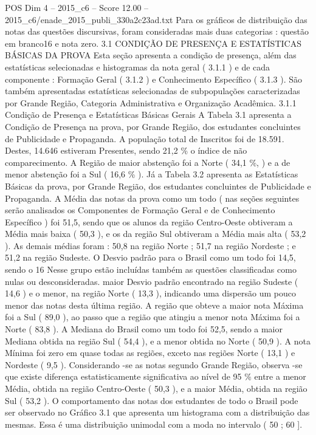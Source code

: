 \begin{textsample}{POS Dim 4 – 2015\_c6 – Score 12.00 – 2015\_c6/enade\_2015\_publi\_330a2c23ad.txt}
Para os gráficos de distribuição das notas das questões discursivas, foram consideradas mais duas categorias : questão em branco16 e nota zero. 3.1 CONDIÇÃO DE PRESENÇA E ESTATÍSTICAS BÁSICAS DA PROVA Esta seção apresenta a condição de presença, além das estatísticas selecionadas e histogramas da nota geral ( 3.1.1 ) e de cada componente : Formação Geral ( 3.1.2 ) e Conhecimento Específico ( 3.1.3 ).
São também apresentadas estatísticas selecionadas de subpopulações caracterizadas por Grande Região, Categoria Administrativa e Organização Acadêmica. 3.1.1 Condição de Presença e Estatísticas Básicas Gerais A Tabela 3.1 apresenta a Condição de Presença na prova, por Grande Região, dos estudantes concluintes de Publicidade e Propaganda.
A população total de Inscritos foi de 18.591.
Destes, 14.646 estiveram Presentes, sendo 21,2 \% o índice de não comparecimento.
A Região de maior abstenção foi a Norte ( 34,1 \%, ) e a de menor abstenção foi a Sul ( 16,6 \% ).
Já a Tabela 3.2 apresenta as Estatísticas Básicas da prova, por Grande Região, dos estudantes concluintes de Publicidade e Propaganda.
A Média das notas da prova como um todo ( nas seções seguintes serão analisados os Componentes de Formação Geral e de Conhecimento Específico ) foi 51,5, sendo que os alunos da região Centro-Oeste obtiveram a Média mais baixa ( 50,3 ), e os da região Sul obtiveram a Média mais alta ( 53,2 ).
As demais médias foram : 50,8 na região Norte ; 51,7 na região Nordeste ; e 51,2 na região Sudeste.
O Desvio padrão para o Brasil como um todo foi 14,5, sendo o 16 Nesse grupo estão incluídas também as questões classificadas como nulas ou desconsideradas. maior Desvio padrão encontrado na região Sudeste ( 14,6 ) e o menor, na região Norte ( 13,3 ), indicando uma dispersão um pouco menor das notas desta última região.
A região que obteve a maior nota Máxima foi a Sul ( 89,0 ), ao passo que a região que atingiu a menor nota Máxima foi a Norte ( 83,8 ).
A Mediana do Brasil como um todo foi 52,5, sendo a maior Mediana obtida na região Sul ( 54,4 ), e a menor obtida no Norte ( 50,9 ).
A nota Mínima foi zero em quase todas as regiões, exceto nas regiões Norte ( 13,1 ) e Nordeste ( 9,5 ).
Considerando -se as notas segundo Grande Região, observa -se que existe diferença estatisticamente significativa ao nível de 95 \% entre a menor Média, obtida na região Centro-Oeste ( 50,3 ), e a maior Média, obtida na região Sul ( 53,2 ).
O comportamento das notas dos estudantes de todo o Brasil pode ser observado no Gráfico 3.1 que apresenta um histograma com a distribuição das mesmas.
Essa é uma distribuição unimodal com a moda no intervalo ( 50 ; 60 ].

\end{textsample}

